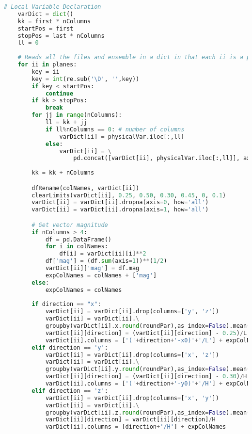 \documentclass[../main.tex]{subfiles}
\begin{document}
\begin{lstlisting}[language=python]
    # Local Variable Declaration
    varDict = dict()
    kk = first * nColumns
    startPos = first
    stopPos = last * nColumns
    ll = 0
  
    # Reads all the files and ensemble in a dict in that each ii is a plane
    for ii in planes:
        key = ii
        key = int(re.sub('\D', '',key))
        if key < startPos:
            continue
        if kk > stopPos: 
            break
        for jj in range(nColumns):
            ll = kk + jj
            if ll%nColumns == 0: # number of columns
                varDict[ii] = physicalVar.iloc[:,ll]
            else:
                varDict[ii] = \
                    pd.concat([varDict[ii], physicalVar.iloc[:,ll]], axis=1)
                    
        kk = kk + nColumns

        dfRename(colNames, varDict[ii])
        clearLimits(varDict[ii], 0.25, 0.50, 0.30, 0.45, 0, 0.1)
        varDict[ii] = varDict[ii].dropna(axis=0, how='all')
        varDict[ii] = varDict[ii].dropna(axis=1, how='all')

        # Get vector magnitude
        if nColumns > 4:
            df = pd.DataFrame()
            for i in colNames:
                df[i] = varDict[ii][i]**2
            df['mag'] = (df.sum(axis=1))**(1/2)
            varDict[ii]['mag'] = df.mag
            expColNames = colNames + ['mag']
        else:
            expColNames = colNames
            
        if direction == "x":
            varDict[ii] = varDict[ii].drop(columns=['y', 'z'])
            varDict[ii] = varDict[ii].\
            groupby(varDict[ii].x.round(roundPar),as_index=False).mean()
            varDict[ii][direction] = (varDict[ii][direction] - 0.25)/L
            varDict[ii].columns = ['('+direction+'-x0)'+'/L'] + expColNames
        elif direction == 'y':
            varDict[ii] = varDict[ii].drop(columns=['x', 'z'])
            varDict[ii] = varDict[ii].\
            groupby(varDict[ii].y.round(roundPar),as_index=False).mean()
            varDict[ii][direction] = (varDict[ii][direction] - 0.30)/H
            varDict[ii].columns = ['('+direction+'-y0)'+'/H'] + expColNames
        elif direction == 'z':
            varDict[ii] = varDict[ii].drop(columns=['x', 'y'])
            varDict[ii] = varDict[ii].\
            groupby(varDict[ii].z.round(roundPar),as_index=False).mean()
            varDict[ii][direction] = varDict[ii][direction]/H
            varDict[ii].columns = [direction+'/H'] + expColNames
            

\end{lstlisting}
\end{document}
